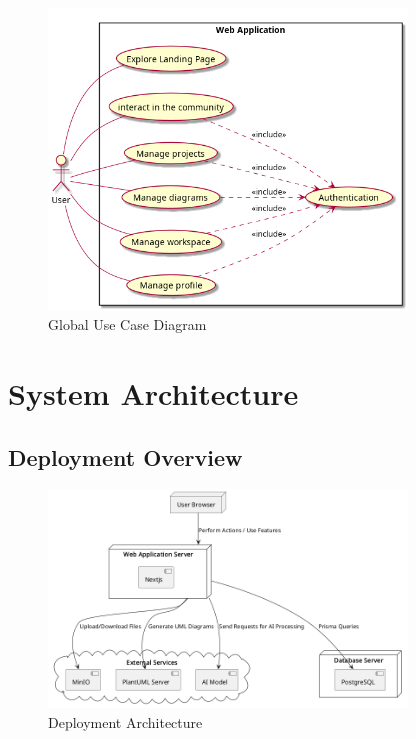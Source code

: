 \begin{figure}[H]
    \centering
    \includegraphics[width=0.85\textwidth]{./conception/global_use_case_diagram.png}
    \caption{Global Use Case Diagram}
    \label{fig:global_use_case}
\end{figure}

\section{System Architecture}

\subsection{Deployment Overview}

\begin{figure}[H]
    \centering
    \includegraphics[width=0.85\textwidth]{./conception/deployement_diagram.png}
    \caption{Deployment Architecture}
    \label{fig:deployment}
\end{figure}


